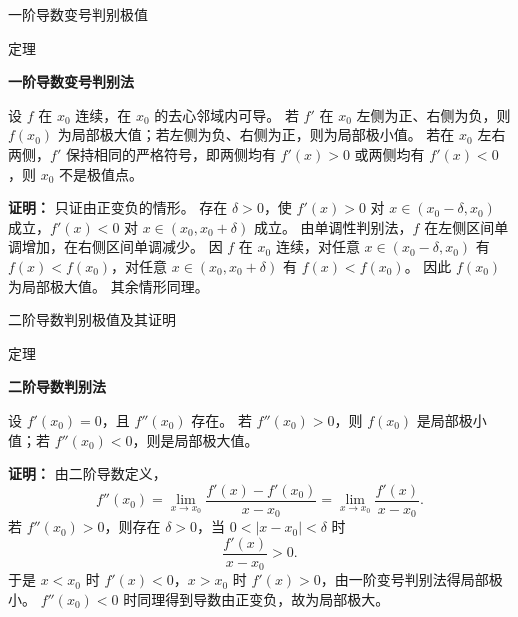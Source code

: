 \documentclass[aspectratio=169,10pt,fontset=fandol]{ctexbeamer}
\begin{document}
\begin{frame}[t,fragile]{一阶导数变号判别极值}
\normalsize
\begin{block}{定理}
{\normalsize
\textbf{一阶导数变号判别法}\par

设 $f$ 在 $x_0$ 连续，在 $x_0$ 的去心邻域内可导。 若 $f'$ 在 $x_0$ 左侧为正、右侧为负，则 $f(x_0)$ 为局部极大值；若左侧为负、右侧为正，则为局部极小值。 若在 $x_0$ 左右两侧，$f'$ 保持相同的严格符号，即两侧均有 $f'(x)>0$ 或两侧均有 $f'(x)<0$，则 $x_0$ 不是极值点。

}
\end{block}
\pause
{\normalsize
\textbf{证明：}
只证由正变负的情形。 存在 $\delta>0$，使 $f'(x)>0$ 对 $x\in(x_0-\delta,x_0)$ 成立，$f'(x)<0$ 对 $x\in(x_0,x_0+\delta)$ 成立。 由单调性判别法，$f$ 在左侧区间单调增加，在右侧区间单调减少。 因 $f$ 在 $x_0$ 连续，对任意 $x\in(x_0-\delta,x_0)$ 有 $f(x)<f(x_0)$，对任意 $x\in(x_0,x_0+\delta)$ 有 $f(x)<f(x_0)$。 因此 $f(x_0)$ 为局部极大值。 其余情形同理。

}
\end{frame}
\begin{frame}[t,fragile]{二阶导数判别极值及其证明}
\small
\begin{block}{定理}
{\small
\textbf{二阶导数判别法}\par

设 $f'(x_0)=0$，且 $f''(x_0)$ 存在。 若 $f''(x_0)>0$，则 $f(x_0)$ 是局部极小值；若 $f''(x_0)<0$，则是局部极大值。

}
\end{block}
\pause
{\small
\textbf{证明：}
由二阶导数定义，
\[
f''(x_0)=\lim_{x\to x_0}\frac{f'(x)-f'(x_0)}{x-x_0}
=\lim_{x\to x_0}\frac{f'(x)}{x-x_0}.
\]
若 $f''(x_0)>0$，则存在 $\delta>0$，当 $0<|x-x_0|<\delta$ 时
\[
\frac{f'(x)}{x-x_0}>0.
\]
于是 $x<x_0$ 时 $f'(x)<0$，$x>x_0$ 时 $f'(x)>0$，由一阶变号判别法得局部极小。 $f''(x_0)<0$ 时同理得到导数由正变负，故为局部极大。

}
\end{frame}
\end{document}
